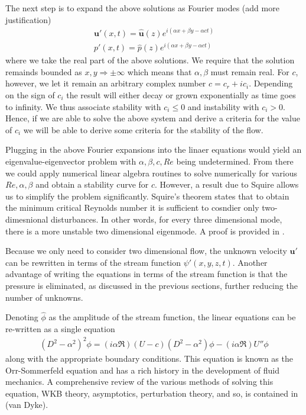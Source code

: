 The next step is to expand the above solutions as Fourier modes (add more justification)
\begin{align}
\bm{u}'(x,t) = \hat{\bm{u}}(z)e^{i(\alpha x +\beta y -\alpha ct)}\\
p'(x,t) = \hat{p}(z)e^{i(\alpha x +\beta y -\alpha ct)}
\end{align}
where we take the real part of the above solutions. We require that the solution remainds bounded as $x,y\Rightarrow\pm\infty$ which means that $\alpha,\beta$ must remain real. For $c$, however, we let it remain an arbitrary complex number $c=c_{r} + ic_{i}$. Depending on the sign of $c_{i}$ the result will either decay or grown exponentially as time goes to infinity. We thus associate stability with $c_{i}\le 0$ and instability with $c_{i}>0$. Hence, if we are able to solve the above system and derive a criteria for the value of $c_{i}$ we will be able to derive some criteria for the stability of the flow.

Plugging in the above Fourier expansions into the linaer equations would yield an eigenvalue-eigenvector problem with $\alpha,\beta,c,Re$ being undetermined. From there we could apply numerical linear algebra routines to solve numerically for various $Re,\alpha,\beta$ and obtain a stability curve for $c$. However, a result due to Squire allows us to simplify the problem significantly. Squire's theorem states that to obtain the minimum critical Reynolds number it is sufficient to cosndier only two-dimesnional disturbances\cite{drazinreid}. In other words, for every three dimensional mode, there is a more unstable two dimensional eigenmode. A proof is provided in \cite{drazinreid}. 

Because we only need to consider two dimensional flow, the unknown velocity $\bm{u}'$ can be rewritten in terms of the stream function $\psi'(x,y,z,t)$. Another advantage of writing the equations in terms of the stream function is that the pressure is eliminated, as discussed in the previous sections, further reducing the number of unknowns. 

Denoting $\hat{\phi}$ as the amplitude of the stream function, the linear equations can be re-written as a single equation
\begin{align}
(D^{2}-\alpha^{2})^{2}\phi = (i\alpha \Re)(U-c)(D^{2}-\alpha^{2})\phi -(i\alpha \Re)U''\phi
\end{align}
along with the appropriate boundary conditions. This equation is known as the Orr-Sommerfeld equation and has a rich history in the development of fluid mechanics. A comprehensive review of the various methods of solving this equation, WKB theory, asymptotics, perturbation theory, and so, is contained in \cite{drazinreid} (van Dyke). 

